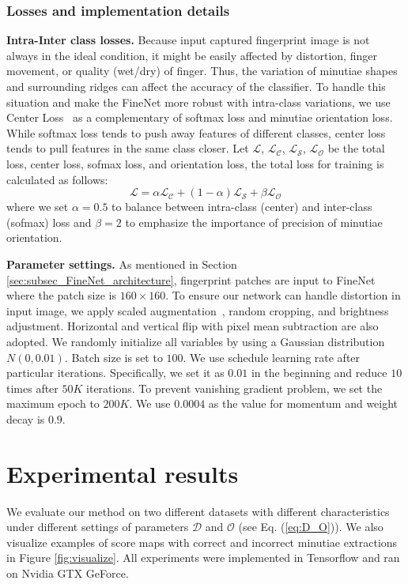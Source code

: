 \documentclass[10pt,twocolumn,letterpaper]{article}
\begin{document}
\subsubsection{Losses and implementation details}
\textbf{Intra-Inter class losses.}
Because input captured fingerprint image is not always in the ideal condition, it might be easily affected by distortion, finger movement, or quality (wet/dry) of finger. Thus, the variation of minutiae shapes and surrounding ridges can affect the accuracy of the classifier. To handle this situation and make the FineNet more robust with intra-class variations, we use Center Loss~\cite{wen2016discriminative} as a complementary of softmax loss and minutiae orientation loss. While softmax loss tends to push away features of different classes, center loss tends to pull features in the same class closer. Let $\mathcal{L}$, $\mathcal{L_C}$, $\mathcal{L_S}$, $\mathcal{L_O}$ be the total loss, center loss, sofmax loss, and orientation loss, the total loss for training is calculated as follows:
\vspace{-2mm}
\begin{equation}
\mathcal{L} = \alpha \mathcal{L_C} + (1-\alpha)\mathcal{L_S} + \beta \mathcal{L_O}
\label{eq:loss_FineNet}
\end{equation}
where we set $\alpha = 0.5$ to balance between intra-class (center) and inter-class (sofmax) loss and $\beta = 2$ to emphasize the importance of precision of minutiae orientation.

\textbf{Parameter settings.}
As mentioned in Section \ref{sec:subsec_FineNet_architecture}, fingerprint patches are input to FineNet where the patch size is $160 \times 160$. To ensure our network can handle distortion in input image, we apply scaled augmentation~\cite{simonyan2014very}, random cropping, and brightness adjustment. Horizontal and vertical flip with pixel mean subtraction are also adopted. We randomly initialize all variables by using a Gaussian distribution $N(0, 0.01)$. Batch size is set to $100$. We use schedule learning rate after particular iterations. Specifically, we set it as $0.01$ in the beginning and reduce $10$ times after $50K$ iterations. To prevent vanishing gradient problem, we set the maximum epoch to $200K$. We use $0.0004$ as the value for momentum and weight decay is $0.9$.
\vspace{-2mm}
\section{Experimental results}
\label{sec:sec_Experiments}
We evaluate our method on two different datasets with different characteristics under different settings of parameters $\mathcal{D}$ and $\mathcal{O}$ (see Eq. (\ref{eq:D_O})). We also visualize examples of score maps with correct and incorrect minutiae extractions in Figure \ref{fig:visualize}. All experiments were implemented in Tensorflow and ran on Nvidia GTX GeForce. 
\vspace{-2mm}
\end{document}

